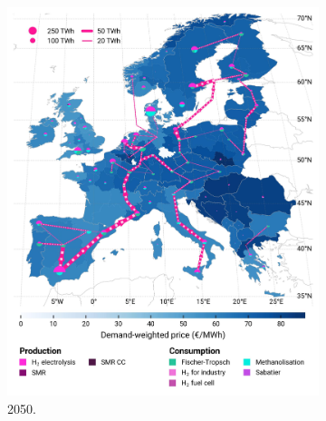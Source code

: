 \documentclass[final,5p,times,twocolumn,sort&compress]{elsarticle}
\begin{document}
\begin{figure}[htbp]
\begin{subfigure}[t]{0.4\textwidth}
      \includegraphics[width=1\textwidth,trim=0cm 0cm 0cm 0cm, clip]{maps/pcipmi/base_s_adm___2050-balance_map_H2}
      \vspace{-0.5cm}
      \caption{ 2050.}
      \label{fig:PCI_lt_2050_h2}
  \end{subfigure}
  \hfill
  \begin{subfigure}[t]{0.4\textwidth}
      \vspace{0pt}

\end{subfigure}
\end{figure}
\end{document}
